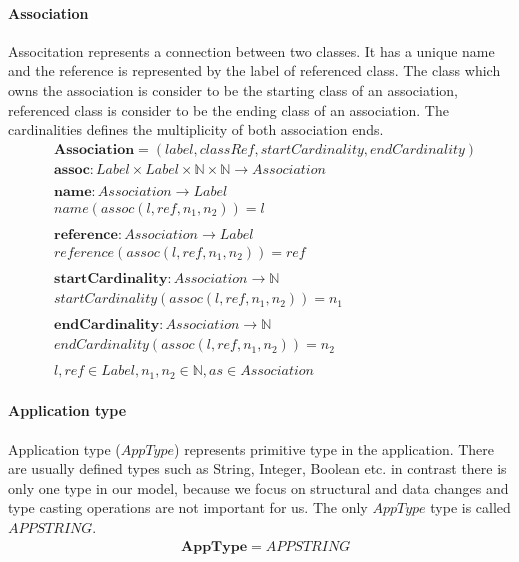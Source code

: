 \documentclass[11pt]{article}
\begin{document}
\paragraph {Association} Associtation represents a connection between two classes. It has a unique name and the reference is represented by the label of referenced class. The class which owns the association is consider to be the starting class of an association, referenced class is consider to be the ending class of an association. The cardinalities defines the multiplicity of both association ends.
\begin{align*}
&	\mathbf{Association} = (label, classRef, startCardinality, endCardinality) \\
&	\mathbf{assoc} : Label \times Label \times \mathbb{N} \times \mathbb{N} \rightarrow Association\\ \\
&	\mathbf{name} : Association \rightarrow Label \\
&	name(assoc(l, ref, n_1, n_2)) = l\\ \\
&	\mathbf{reference} : Association \rightarrow Label \\
&	reference(assoc(l, ref, n_1, n_2)) = ref\\ \\
&	\mathbf{startCardinality} : Association \rightarrow \mathbb{N} \\
&	startCardinality(assoc(l, ref, n_1, n_2)) = n_1\\ \\
&	\mathbf{endCardinality} : Association \rightarrow \mathbb{N} \\
&	endCardinality(assoc(l, ref, n_1, n_2)) = n_2 \\ \\
&	l, ref \in Label,  n_1, n_2 \in \mathbb{N}, as \in Association
\end{align*}



\paragraph{Application type} Application type ($AppType$) represents primitive type in the application. There are usually defined types such as String, Integer, Boolean etc. in contrast there is only one type in our model, because we focus on structural and data changes and type casting operations are not important for us. The only $AppType$ type is called $APPSTRING$.
\begin{align*}
& \mathbf{AppType} = APPSTRING
\end{align*}
\end{document}
